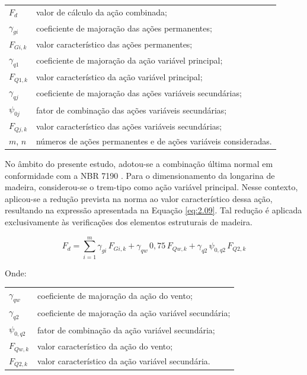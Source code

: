 \begin{tabular}{ll}
$F_d$            & valor de cálculo da ação combinada; \\
$\gamma_{gi}$    & coeficiente de majoração das ações permanentes; \\
$F_{G i,k}$      & valor característico das ações permanentes; \\
$\gamma_{q1}$    & coeficiente de majoração da ação variável principal; \\
$F_{Q1,k}$       & valor característico da ação variável principal; \\
$\gamma_{qj}$    & coeficiente de majoração das ações variáveis secundárias; \\
$\psi_{0j}$      & fator de combinação das ações variáveis secundárias; \\
$F_{Qj,k}$       & valor característico das ações variáveis secundárias; \\
$m$, $n$         & números de ações permanentes e de ações variáveis consideradas.
\end{tabular}

No âmbito do presente estudo, adotou-se a combinação última normal em conformidade com a NBR 7190 \parencite{NBR7190-1:2022}. Para o dimensionamento da longarina de madeira, considerou-se o trem-tipo como ação variável principal. Nesse contexto, aplicou-se a redução prevista na norma ao valor característico dessa ação, resultando na expressão apresentada na Equação \eqref{eq:2.09}. Tal redução é aplicada exclusivamente às verificações dos elementos estruturais de madeira.

\begin{equation}
      F_d = \sum_{i=1}^{m} \gamma_{gi}\, F_{Gi,k}
      + \gamma_{qw}\, 0{,}75\, F_{Qw,k}
      + \gamma_{q2}\, \psi_{0,q2}\, F_{Q2,k}
      \label{eq:2.09}
\end{equation}

Onde:

\begin{tabular}{ll}
$\gamma_{qw}$    & coeficiente de majoração da ação do vento; \\
$\gamma_{q2}$    & coeficiente de majoração da ação variável secundária; \\
$\psi_{0,q2}$    & fator de combinação da ação variável secundária; \\
$F_{Qw,k}$       & valor característico da ação do vento; \\
$F_{Q2,k}$       & valor característico da ação variável secundária.
\end{tabular}

